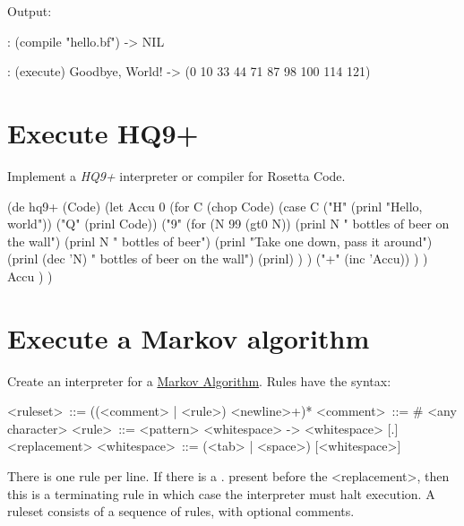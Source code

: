 \begin{wideverbatim}


Output:

: (compile "hello.bf")
-> NIL

: (execute)
Goodbye, World!
-> (0 10 33 44 71 87 98 100 114 121)

\end{wideverbatim}

\pagebreak{}
\section*{Execute HQ9+}

Implement a \emph{HQ9+} interpreter or compiler for Rosetta Code.


\begin{wideverbatim}

(de hq9+ (Code)
   (let Accu 0
      (for C (chop Code)
         (case C
            ("H" (prinl "Hello, world"))
            ("Q" (prinl Code))
            ("9"
               (for (N 99 (gt0 N))
                  (prinl N " bottles of beer on the wall")
                  (prinl N " bottles of beer")
                  (prinl "Take one down, pass it around")
                  (prinl (dec 'N) " bottles of beer on the wall")
                  (prinl) ) )
            ("+" (inc 'Accu)) ) )
      Accu ) )

\end{wideverbatim}

\pagebreak{}
\section*{Execute a Markov algorithm}

Create an interpreter for a
\href{http://en.wikipedia.org/wiki/Markov\_algorithm}{Markov
  Algorithm}. Rules have the syntax:

\begin{wideverbatim}
<ruleset> ::= ((<comment> | <rule>) <newline>+)*
<comment> ::= # {<any character>}
<rule> ::= <pattern> <whitespace> -> <whitespace> [.] <replacement>
<whitespace> ::= (<tab> | <space>) [<whitespace>]
\end{wideverbatim}

There is one rule per line. If there is a . present before the
\textless{}replacement\textgreater{}, then this is a terminating rule
in which case the interpreter must halt execution. A ruleset consists
of a sequence of rules, with optional comments.



